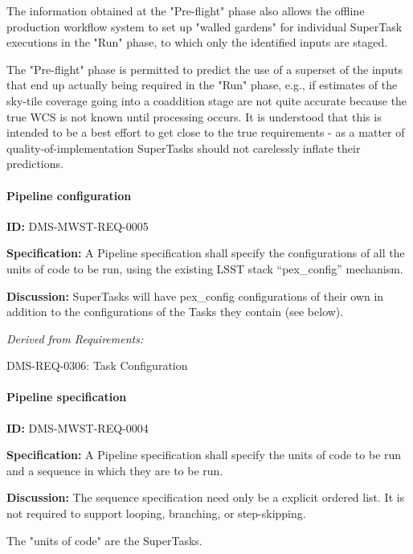 \documentclass[SE,toc,lsstdraft]{lsstdoc}
\begin{document}
The information obtained at the "Pre-flight" phase also allows the offline production workflow system to set up "walled gardens" for individual SuperTask executions in the "Run" phase, to which only the identified inputs are staged.

The "Pre-flight" phase is permitted to predict the use of a superset of the inputs that end up actually being required in the "Run" phase, e.g., if estimates of the sky-tile coverage going into a coaddition stage are not quite accurate because the true WCS is not known until processing occurs. It is understood that this is intended to be a best effort to get close to the true requirements - as a matter of quality-of-implementation SuperTasks should not carelessly inflate their predictions.

\paragraph{Pipeline configuration}\hfill  %

\label{DMS-MWST-REQ-0005}
\textbf{ID:} DMS-MWST-REQ-0005

\textbf{Specification:}
A Pipeline specification shall specify the configurations of all the units of code to be run, using the existing LSST stack “pex\_config” mechanism.

\textbf{Discussion:}
SuperTasks will have pex\_config configurations of their own in addition to the configurations of the Tasks they contain (see below).

\emph{Derived from Requirements:}

DMS-REQ-0306:
Task Configuration \newline

\paragraph{Pipeline specification}\hfill  %

\label{DMS-MWST-REQ-0004}
\textbf{ID:} DMS-MWST-REQ-0004

\textbf{Specification:}
A Pipeline specification shall specify the units of code to be run and a sequence in which they are to be run.

\textbf{Discussion:}
The sequence specification need only be a explicit ordered list.  It is not required to support looping, branching, or step-skipping.

The "units of code" are the SuperTasks.
\end{document}
